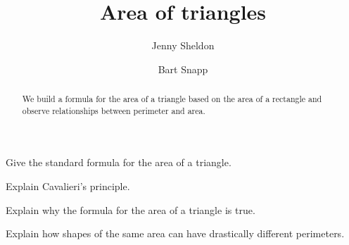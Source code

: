 \documentclass[nooutcomes,noauthor,handout,hints,12pt]{ximera}
\title{Area of triangles}
\author{Jenny Sheldon \and Bart Snapp}
\begin{document}
\begin{abstract}
  We build a formula for the area of a triangle based on the area of a
  rectangle and observe relationships between perimeter and area.
\end{abstract}
\maketitle


\begin{listOutcomes}
\item Give the standard formula for the area of a triangle.
\item Explain Cavalieri's principle.
\item Explain why the formula for the area of a triangle is true.
\item Explain how shapes of the same area can have drastically
  different perimeters.
\end{listOutcomes}



\mynewpage
\end{document}
